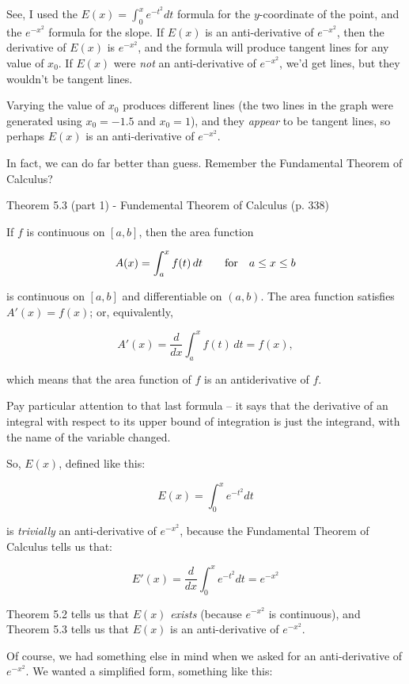 See, I used the $E(x) = \int_0^x e^{-t^2} dt$ formula for the $y$-coordinate of the point,
and the $e^{-x^2}$ formula for the slope.
If $E(x)$ is an anti-derivative of $e^{-x^2}$, then the derivative of $E(x)$ is $e^{-x^2}$, and
the formula will produce tangent lines for any value of $x_0$.  If $E(x)$ were {\it not} an anti-derivative of $e^{-x^2}$,
we'd get lines, but they wouldn't be tangent lines.

Varying the value of $x_0$ produces different lines (the two lines in the graph were generated using $x_0 = -1.5$ and $x_0=1$),
and they {\it appear} to be tangent
lines, so perhaps $E(x)$ is an anti-derivative of $e^{-x^2}$.

In fact, we can do far better than guess.  Remember the Fundamental Theorem of Calculus?


\begin{framed}
Theorem 5.3 (part 1) - Fundemental Theorem of Calculus (p. 338)

If $f$ is continuous on $[a,b]$, then the area function

$$A(x) = \int_a^x f(t)\, dt \qquad {\rm for\quad} a \le x \le b$$

is continuous on $[a,b]$ and differentiable on $(a,b)$.  The area function satisfies $A'(x) = f(x)$; or, equivalently,

$$A'(x) = \frac{d}{dx} \int_a^x f(t)\, dt = f(x),$$

which means that the area function of $f$ is an antiderivative of $f$.
\end{framed}

Pay particular attention to that last formula -- it says that the derivative of an integral with respect
to its upper bound of integration is just the integrand, with the name of the variable changed.

So, $E(x)$, defined like this:

$$E(x) = \int_0^x e^{-t^2} dt$$

is {\it trivially} an anti-derivative of $e^{-x^2}$, because the Fundamental Theorem of Calculus tells us that:

$$E'(x) = \frac{d}{dx} \int_0^x e^{-t^2} dt = e^{-x^2}$$

Theorem 5.2 tells us that $E(x)$ {\it exists} (because $e^{-x^2}$ is continuous), and Theorem 5.3 tells
us that $E(x)$ is an anti-derivative of $e^{-x^2}$.

Of course, we had something else in mind when we asked for an anti-derivative of $e^{-x^2}$.  We wanted
a simplified form, something like this:

